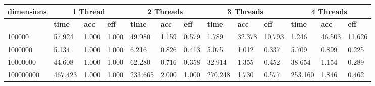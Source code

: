 \documentclass{article}
\begin{document}
\begin{table}[]\begin{tabular}{|l|l|l|l|l|l|l|l|l|l|l|l|l|}\hline
\multicolumn{1}{|c|}{\textbf{dimensions}} & \multicolumn{3}{c|}{\textbf{1 Thread}} & \multicolumn{3}{c|}{\textbf{2 Threads}} & \multicolumn{3}{c|}{\textbf{3 Threads}} & \multicolumn{3}{c|}{\textbf{4 Threads}} \\ \hline
 & \textbf{time} & \textbf{acc} & \textbf{eff} & \textbf{time} & \textbf{acc} & \textbf{eff} & \textbf{time} & \textbf{acc} & \textbf{eff} & \textbf{time} & \textbf{acc} & \textbf{eff}\\ \hline
100000
 & 57.924 & 1.000 & 1.000 & 49.980 & 1.159 & 0.579 & 1.789 & 32.378 & 10.793 & 1.246 & 46.503 & 11.626\\ \hline
1000000
 & 5.134 & 1.000 & 1.000 & 6.216 & 0.826 & 0.413 & 5.075 & 1.012 & 0.337 & 5.709 & 0.899 & 0.225\\ \hline
10000000
 & 44.608 & 1.000 & 1.000 & 62.280 & 0.716 & 0.358 & 32.914 & 1.355 & 0.452 & 38.654 & 1.154 & 0.289\\ \hline
100000000
 & 467.423 & 1.000 & 1.000 & 233.665 & 2.000 & 1.000 & 270.248 & 1.730 & 0.577 & 253.160 & 1.846 & 0.462\\ \hline
\end{tabular}
\end{table}
\end{document}
